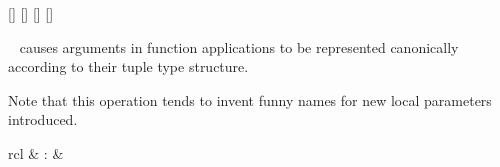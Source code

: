\begin{isabellebody}
\begin{isamarkuptext}
  \begin{railoutput}
[]
\rail@bar
{}
[]
[]
[]
\rail@endbar
\rail@end
\end{railoutput}


  \begin{description}

  \item \hyperlink{attribute.HOL.split-format}{\mbox{}}\  causes
  arguments in function applications to be represented canonically
  according to their tuple type structure.

  Note that this operation tends to invent funny names for new local
  parameters introduced.

  \end{description}%
\end{isamarkuptext}%
\isamarkuptrue%
%
\isamarkuptrue%
%
\begin{isamarkuptext}%
\begin{matharray}{rcl}
    \hypertarget{command.HOL.typedef}{\hyperlink{command.HOL.typedef}{\mbox{}}} & : &  \\
  \end{matharray}


\end{isamarkuptext}
\end{isabellebody}
